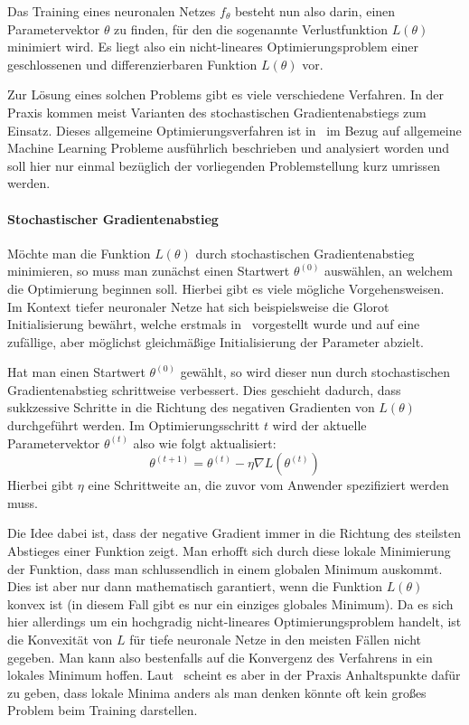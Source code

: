Das Training eines neuronalen Netzes $f_\theta$ besteht nun also darin,
einen Parametervektor $\theta$ zu finden, f\"ur den die sogenannte
Verlustfunktion $L(\theta)$ minimiert wird.
Es liegt also ein nicht-lineares Optimierungsproblem einer geschlossenen
und differenzierbaren Funktion $L(\theta)$ vor.

Zur L\"osung eines solchen Problems gibt es viele verschiedene Verfahren.
In der Praxis kommen meist Varianten des stochastischen Gradientenabstiegs
zum Einsatz. Dieses allgemeine Optimierungsverfahren ist in~\cite{understanding_ml}
im Bezug auf allgemeine Machine Learning Probleme ausf\"uhrlich beschrieben
und analysiert worden und soll hier nur einmal bez\"uglich der
vorliegenden Problemstellung kurz umrissen werden.

\paragraph{Stochastischer Gradientenabstieg}

M\"ochte man die Funktion $L(\theta)$ durch stochastischen Gradientenabstieg
minimieren, so muss man zun\"achst einen Startwert $\theta^{(0)}$
ausw\"ahlen, an welchem die Optimierung beginnen soll.
Hierbei gibt es viele m\"ogliche Vorgehensweisen.
Im Kontext tiefer neuronaler Netze hat sich beispielsweise die
Glorot Initialisierung bew\"ahrt, welche erstmals in~\cite{glorot_init}
vorgestellt wurde und auf eine zuf\"allige, aber m\"oglichst gleichm\"a{\ss}ige
Initialisierung der Parameter abzielt.

Hat man einen Startwert $\theta^{(0)}$ gew\"ahlt, so wird dieser nun
durch stochastischen Gradientenabstieg schrittweise verbessert.
Dies geschieht dadurch, dass sukkzessive Schritte in die Richtung
des negativen Gradienten von $L(\theta)$ durchgef\"uhrt werden.
Im Optimierungsschritt $t$ wird der aktuelle Parametervektor $\theta^{(t)}$
also wie folgt aktualisiert:
\begin{equation}
    \theta^{(t+1)} = \theta^{(t)} - \eta \nabla L(\theta^{(t)})
\end{equation}
Hierbei gibt $\eta$ eine Schrittweite an, die zuvor vom Anwender
spezifiziert werden muss.

Die Idee dabei ist, dass der negative Gradient immer in die Richtung
des steilsten Abstieges einer Funktion zeigt.
Man erhofft sich durch diese lokale Minimierung der Funktion, dass
man schlussendlich in einem globalen Minimum auskommt. Dies ist aber nur
dann mathematisch garantiert, wenn die Funktion $L(\theta)$ konvex ist
(in diesem Fall gibt es nur ein einziges globales Minimum).
Da es sich hier allerdings um ein hochgradig nicht-lineares Optimierungsproblem
handelt, ist die Konvexit\"at von $L$ f\"ur tiefe neuronale Netze in den
meisten F\"allen nicht gegeben. Man kann also bestenfalls auf die Konvergenz
des Verfahrens in ein lokales Minimum hoffen.
Laut~\cite{local_minima} scheint es aber in der Praxis Anhaltspunkte
daf\"ur zu geben, dass lokale Minima anders als man denken k\"onnte
oft kein gro{\ss}es Problem beim Training darstellen.

